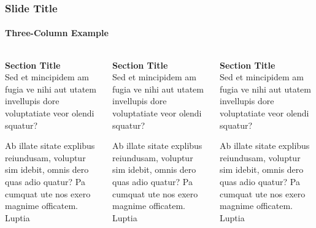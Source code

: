 \documentclass[
aspectratio=169, %
t, %
onlytextwidth, %
10pt, %
]{beamer}
\begin{document}

\begin{frame}
    \frametitle{Slide Title}
    \framesubtitle{Three-Column Example}

    \small %

    \begin{columns}[T] %
        \begin{column}{0.3\linewidth} %
            \textbf{Section Title}\\
            Sed et mincipidem am fugia ve nihi aut utatem invellupis dore voluptatiate veor olendi squatur?

            Ab illate sitate explibus reiundusam, voluptur sim idebit, omnis dero quas adio quatur? Pa cumquat ute nos exero magnime officatem. Luptia
        \end{column}
        \begin{column}{0.3\linewidth} %
            \textbf{Section Title}\\
            Sed et mincipidem am fugia ve nihi aut utatem invellupis dore voluptatiate veor olendi squatur?

            Ab illate sitate explibus reiundusam, voluptur sim idebit, omnis dero quas adio quatur? Pa cumquat ute nos exero magnime officatem. Luptia
        \end{column}
        \begin{column}{0.3\linewidth} %
            \textbf{Section Title}\\
            Sed et mincipidem am fugia ve nihi aut utatem invellupis dore voluptatiate veor olendi squatur?

            Ab illate sitate explibus reiundusam, voluptur sim idebit, omnis dero quas adio quatur? Pa cumquat ute nos exero magnime officatem. Luptia
        \end{column}
    \end{columns}
\end{frame}

\end{document}
